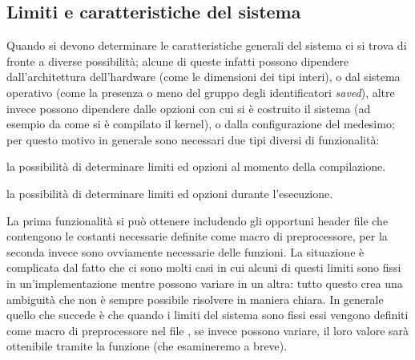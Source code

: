 \subsection{Limiti e caratteristiche del sistema}
\label{sec:sys_limits}

Quando si devono determinare le caratteristiche generali del sistema ci si
trova di fronte a diverse possibilità; alcune di queste infatti possono
dipendere dall'architettura dell'hardware (come le dimensioni dei tipi
interi), o dal sistema operativo (come la presenza o meno del gruppo degli
identificatori \textit{saved}), altre invece possono dipendere dalle opzioni
con cui si è costruito il sistema (ad esempio da come si è compilato il
kernel), o dalla configurazione del medesimo; per questo motivo in generale
sono necessari due tipi diversi di funzionalità:
\begin{itemize*}
\item la possibilità di determinare limiti ed opzioni al momento della
  compilazione.
\item la possibilità di determinare limiti ed opzioni durante l'esecuzione.
\end{itemize*}

La prima funzionalità si può ottenere includendo gli opportuni header file che
contengono le costanti necessarie definite come macro di preprocessore, per la
seconda invece sono ovviamente necessarie delle funzioni. La situazione è
complicata dal fatto che ci sono molti casi in cui alcuni di questi limiti
sono fissi in un'implementazione mentre possono variare in un altra: tutto
questo crea una ambiguità che non è sempre possibile risolvere in maniera
chiara. In generale quello che succede è che quando i limiti del sistema sono
fissi essi vengono definiti come macro di preprocessore nel file
, se invece possono variare, il loro valore sarà ottenibile
tramite la funzione  (che esamineremo a breve).

